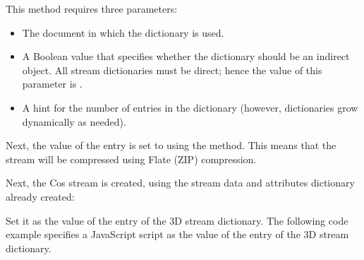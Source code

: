 \documentclass[letterpaper,12pt,english,openany,oneside]{sphinxmanual}
\begin{document}
This method requires three parameters:
\begin{itemize}
\item {} 
The document in which the dictionary is used.

\item {} 
A Boolean value that specifies whether the dictionary should be an indirect object. All stream dictionaries must be direct; hence the value of this parameter is .

\item {} 
A hint for the number of entries in the dictionary (however, dictionaries grow dynamically as needed).

\end{itemize}

Next, the value of the  entry is set to  using the  method. This means that the stream will be compressed using Flate (ZIP) compression.

\begin{sphinxVerbatim}[commandchars=\\\{\}]
 
       
\end{sphinxVerbatim}

Next, the Cos stream is created, using the stream data and attributes dictionary already created:

\begin{sphinxVerbatim}[commandchars=\\\{\}]
   
          
      
           
      
\end{sphinxVerbatim}

Set it as the value of the  entry of the 3D stream dictionary. The following code example specifies a JavaScript script as the value of the  entry of the 3D stream dictionary.
\end{document}
